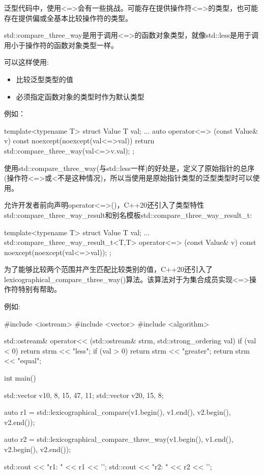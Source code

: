 
泛型代码中，使用<=>会有一些挑战。可能存在提供操作符<=>的类型，也可能存在提供偏或全基本比较操作符的类型。


std::compare\_three\_way是用于调用<=>的函数对象类型，就像std::less是用于调用小于操作符的函数对象类型一样。

可以这样使用:

\begin{itemize}
\item
比较泛型类型的值

\item
必须指定函数对象的类型时作为默认类型
\end{itemize}

例如：

\begin{cpp}
template<typename T>
struct Value {
	T val{};
	...
	auto operator<=> (const Value& v) const noexcept(noexcept(val<=>val)) {
		return std::compare_three_way{}(val<=>v.val);
	}
};
\end{cpp}

使用std::compare\_three\_way(与std::less一样)的好处是，定义了原始指针的总序(操作符<=>或<不是这种情况)，所以当使用是原始指针类型的泛型类型时可以使用。

允许开发者前向声明operator<=>()，C++20还引入了类型特性std::compare\_three\_way\_result和别名模板std::compare\_three\_way\_result\_t:

\begin{cpp}
template<typename T>
struct Value {
	T val{};
	...
	std::compare_three_way_result_t<T,T>
		operator<=> (const Value& v) const noexcept(noexcept(val<=>val));
};
\end{cpp}


为了能够比较两个范围并产生匹配比较类别的值，C++20还引入了lexicographical\_compare\_three\_way()算法。该算法对于为集合成员实现<=>操作符特别有帮助。

例如:


\begin{cpp}
#include <iostream>
#include <vector>
#include <algorithm>

std::ostream& operator<< (std::ostream& strm, std::strong_ordering val)
{
	if (val < 0) return strm << "less";
	if (val > 0) return strm << "greater";
	return strm << "equal";
}

int main()
{
	std::vector v1{0, 8, 15, 47, 11};
	std::vector v2{0, 15, 8};

	auto r1 = std::lexicographical_compare(v1.begin(), v1.end(),
										   v2.begin(), v2.end());

	auto r2 = std::lexicographical_compare_three_way(v1.begin(), v1.end(),
													 v2.begin(), v2.end());

	std::cout << "r1: " << r1 << '\n';
	std::cout << "r2: " << r2 << '\n';
}
\end{cpp}

